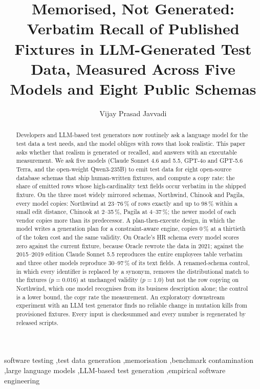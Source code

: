 \documentclass[preprint,12pt]{elsarticle}
\begin{document}
\begin{frontmatter}

\title{Memorised, Not Generated: Verbatim Recall of Published Fixtures in LLM-Generated Test Data, Measured Across Five Models and Eight Public Schemas}

\author{Vijay Prasad Javvadi}
\address{Independent Researcher, Plainsboro, NJ, USA}

\begin{abstract}
Developers and LLM-based test generators now routinely ask a language model for the test data a test needs, and the model obliges with rows that look realistic. This paper asks whether that realism is generated or recalled, and answers with an executable measurement. We ask five models (Claude Sonnet 4.6 and 5.5, GPT-4o and GPT-5.6 Terra, and the open-weight Qwen3-235B) to emit test data for eight open-source database schemas that ship human-written fixtures, and compute a copy rate: the share of emitted rows whose high-cardinality text fields occur verbatim in the shipped fixture. On the three most widely mirrored schemas, Northwind, Chinook and Pagila, every model copies: Northwind at 23--76\,\% of rows exactly and up to 98\,\% within a small edit distance, Chinook at 2--35\,\%, Pagila at 4--37\,\%; the newer model of each vendor copies more than its predecessor. A plan-then-execute design, in which the model writes a generation plan for a constraint-aware engine, copies 0\,\% at a thirtieth of the token cost and the same validity. On Oracle's HR schema every model scores zero against the current fixture, because Oracle rewrote the data in 2021; against the 2015--2019 edition Claude Sonnet 5.5 reproduces the entire employees table verbatim and three other models reproduce 30--97\,\% of its text fields. A renamed-schema control, in which every identifier is replaced by a synonym, removes the distributional match to the fixtures ($p=0.016$) at unchanged validity ($p=1.0$) but not the row copying on Northwind, which one model recognises from its business description alone; the control is a lower bound, the copy rate the measurement. An exploratory downstream experiment with an LLM test generator finds no reliable change in mutation kills from provisioned fixtures. Every input is checksummed and every number is regenerated by released scripts.
\end{abstract}

\begin{keyword}
software testing \sep test data generation \sep memorisation \sep benchmark contamination \sep large language models \sep LLM-based test generation \sep empirical software engineering
\end{keyword}
\end{frontmatter}
\end{document}
